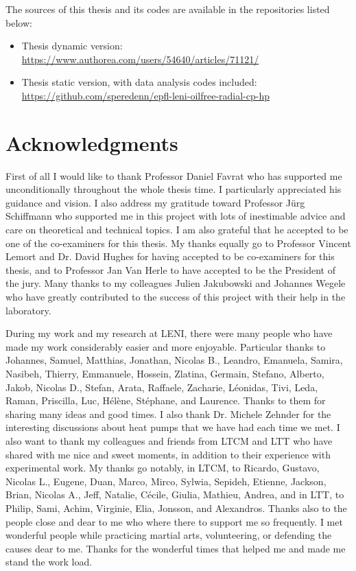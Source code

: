 The sources of this thesis and its codes are available in the
repositories listed below:

\begin{itemize}
\item Thesis dynamic version:\\ \href{https://www.authorea.com/users/54640/articles/71121/}{https://www.authorea.com/users/54640/articles/71121/}
\item Thesis static version, with data analysis codes included:\\ \href{https://github.com/speredenn/epfl-leni-oilfree-radial-cp-hp}{https://github.com/speredenn/epfl-leni-oilfree-radial-cp-hp}
\end{itemize}

\section*{Acknowledgments}
\label{sec:thanks}

First of all I would like to thank Professor Daniel Favrat who has
supported me unconditionally throughout the whole thesis time. I
particularly appreciated his guidance and vision. I also address my
gratitude toward Professor Jürg Schiffmann who supported me in this
project with lots of inestimable advice and care on theoretical and
technical topics. I am also grateful that he accepted to be one of the
co-examiners for this thesis. My thanks equally go to Professor
Vincent Lemort and Dr. David Hughes for having accepted to be
co-examiners for this thesis, and to Professor Jan Van Herle to have
accepted to be the President of the jury. Many thanks to my colleagues
Julien Jakubowski and Johannes Wegele who have greatly contributed to
the success of this project with their help in the laboratory.

During my work and my research at LENI, there were many people who
have made my work considerably easier and more enjoyable. Particular
thanks to Johannes, Samuel, Matthias, Jonathan, Nicolas B., Leandro,
Emanuela, Samira, Nasibeh, Thierry, Emmanuele, Hossein, Zlatina,
Germain, Stefano, Alberto, Jakob, Nicolas D., Stefan, Arata, Raffaele,
Zacharie, Léonidas, Tivi, Leda, Raman, Priscilla, Luc, Hélène,
Stéphane, and Laurence. Thanks to them for sharing many ideas and good
times. I also thank Dr. Michele Zehnder for the interesting
discussions about heat pumps that we have had each time we met. I also
want to thank my colleagues and friends from LTCM and LTT who have
shared with me nice and sweet moments, in addition to their experience
with experimental work. My thanks go notably, in LTCM, to Ricardo,
Gustavo, Nicolas L., Eugene, Duan, Marco, Mirco, Sylwia, Sepideh,
Etienne, Jackson, Brian, Nicolas A., Jeff, Natalie, Cécile, Giulia,
Mathieu, Andrea, and in LTT, to Philip, Sami, Achim, Virginie, Elia,
Jonsson, and Alexandros. Thanks also to the people close and dear to
me who where there to support me so frequently. I met wonderful people
while practicing martial arts, volunteering, or defending the causes
dear to me. Thanks for the wonderful times that helped me and made me
stand the work load.

